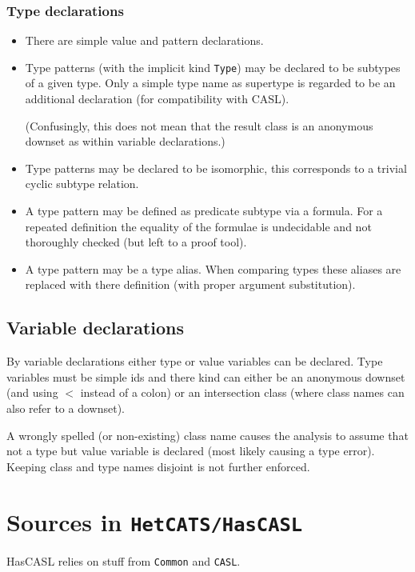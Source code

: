 \documentclass{article}
\begin{document}
\subsubsection*{Type declarations}

\begin{itemize}
\item There are simple value and pattern declarations. 
\item Type patterns (with the implicit kind \texttt{Type})
  may be declared to be subtypes of a given type. Only a simple type name as
  supertype is regarded to be an additional declaration (for compatibility
  with CASL).
  
  (Confusingly, this does not mean that the result class is an anonymous
  downset as within variable declarations.)
\item Type patterns may be declared to be isomorphic, this corresponds to a
  trivial cyclic subtype relation.
\item A type pattern may be defined as predicate subtype via a
  formula. For a repeated definition the equality of the formulae is
  undecidable and not thoroughly checked (but left to a proof tool).  
\item A type pattern may be a type alias. When comparing types these aliases
  are replaced with there definition (with proper argument substitution). 
\end{itemize}

\subsection{Variable declarations}

By variable declarations either type or value variables can be declared.
Type variables must be simple ids and there kind can either be an anonymous
downset (and using $<$ instead of a colon) or an intersection class (where
class names can also refer to a downset).

A wrongly spelled (or non-existing) class name causes the analysis to assume
that not a type but value variable is declared (most likely causing a type
error). Keeping class and type names disjoint is not further enforced.


\section{Sources in \texttt{HetCATS/HasCASL}}

HasCASL relies on stuff from \texttt{Common} and \texttt{CASL}.
\end{document}
